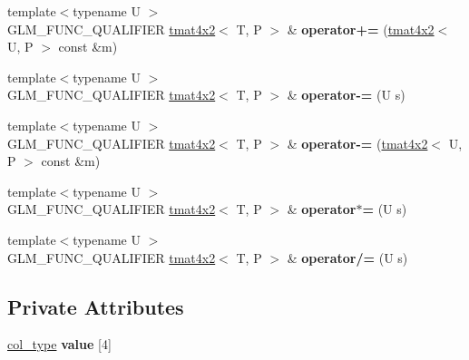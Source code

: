 \begin{DoxyCompactItemize}
\item 
{\footnotesize template$<$typename U $>$ }\\G\+L\+M\+\_\+\+F\+U\+N\+C\+\_\+\+Q\+U\+A\+L\+I\+F\+I\+ER \hyperlink{structglm_1_1detail_1_1tmat4x2}{tmat4x2}$<$ T, P $>$ \& {\bfseries operator+=} (\hyperlink{structglm_1_1detail_1_1tmat4x2}{tmat4x2}$<$ U, P $>$ const \&m)\hypertarget{structglm_1_1detail_1_1tmat4x2_a39682439b0540114d8a90dfb96ff09e7}{}\label{structglm_1_1detail_1_1tmat4x2_a39682439b0540114d8a90dfb96ff09e7}

\item 
{\footnotesize template$<$typename U $>$ }\\G\+L\+M\+\_\+\+F\+U\+N\+C\+\_\+\+Q\+U\+A\+L\+I\+F\+I\+ER \hyperlink{structglm_1_1detail_1_1tmat4x2}{tmat4x2}$<$ T, P $>$ \& {\bfseries operator-\/=} (U s)\hypertarget{structglm_1_1detail_1_1tmat4x2_a1e70f82c8238bde1d32bb4398464079c}{}\label{structglm_1_1detail_1_1tmat4x2_a1e70f82c8238bde1d32bb4398464079c}

\item 
{\footnotesize template$<$typename U $>$ }\\G\+L\+M\+\_\+\+F\+U\+N\+C\+\_\+\+Q\+U\+A\+L\+I\+F\+I\+ER \hyperlink{structglm_1_1detail_1_1tmat4x2}{tmat4x2}$<$ T, P $>$ \& {\bfseries operator-\/=} (\hyperlink{structglm_1_1detail_1_1tmat4x2}{tmat4x2}$<$ U, P $>$ const \&m)\hypertarget{structglm_1_1detail_1_1tmat4x2_a85080df35d7d859072e4bdcd955747d5}{}\label{structglm_1_1detail_1_1tmat4x2_a85080df35d7d859072e4bdcd955747d5}

\item 
{\footnotesize template$<$typename U $>$ }\\G\+L\+M\+\_\+\+F\+U\+N\+C\+\_\+\+Q\+U\+A\+L\+I\+F\+I\+ER \hyperlink{structglm_1_1detail_1_1tmat4x2}{tmat4x2}$<$ T, P $>$ \& {\bfseries operator$\ast$=} (U s)\hypertarget{structglm_1_1detail_1_1tmat4x2_a2fc51001f24270fc2c93b824668678ad}{}\label{structglm_1_1detail_1_1tmat4x2_a2fc51001f24270fc2c93b824668678ad}

\item 
{\footnotesize template$<$typename U $>$ }\\G\+L\+M\+\_\+\+F\+U\+N\+C\+\_\+\+Q\+U\+A\+L\+I\+F\+I\+ER \hyperlink{structglm_1_1detail_1_1tmat4x2}{tmat4x2}$<$ T, P $>$ \& {\bfseries operator/=} (U s)\hypertarget{structglm_1_1detail_1_1tmat4x2_acfd79479bd1ebfb4a6c7c654d0648a5b}{}\label{structglm_1_1detail_1_1tmat4x2_acfd79479bd1ebfb4a6c7c654d0648a5b}

\end{DoxyCompactItemize}
\subsection*{Private Attributes}
\begin{DoxyCompactItemize}
\item 
\hyperlink{structglm_1_1detail_1_1tvec2}{col\+\_\+type} {\bfseries value} \mbox{[}4\mbox{]}\hypertarget{structglm_1_1detail_1_1tmat4x2_aa7e9892d06c4a488cde93c0e7ec15995}{}\label{structglm_1_1detail_1_1tmat4x2_aa7e9892d06c4a488cde93c0e7ec15995}

\end{DoxyCompactItemize}



